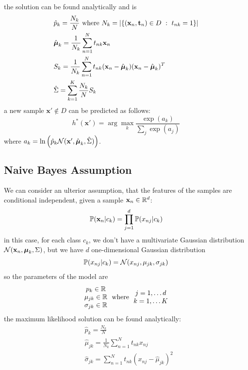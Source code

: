 \documentclass[10pt, letterpaper]{report}
\begin{document}
the solution can be found analytically and is\begin{align}
	 & \hat p_k=\frac{N_k}{N}\text{ where }N_k=|\{(\mathbf x_n,\mathbf t_n)\in D \ : \ t_{nk}=1\}| \\
	 & \hat{{\boldsymbol{\mu}}}_k=\frac{1}{N_k}\sum_{n=1}^Nt_{nk}\mathbf x_n                                       \\
	 & S_k=\frac{1}{N_k}\sum_{n=1}^Nt_{nk}(\mathbf x_n-\hat{{\boldsymbol{\mu}}}_k)(\mathbf x_n-\hat{{\boldsymbol{\mu}}}_k)^T       \\
	 & \hat \Sigma = \sum_{k=1}^{K}\frac{N_k}{N}S_k
\end{align}
a new sample $\mathbf x'\notin D$ can be predicted as follows:\begin{equation}
	h^*(\mathbf x')=\arg\max_k\frac{\exp(a_k)}{\sum_j\exp(a_j)}
\end{equation}
where $a_k=\ln\left(\hat p_k\mathcal N(\mathbf x',\hat{{\boldsymbol{\mu}}}_k,\hat\Sigma)\right)$.
\subsection{Naive Bayes Assumption}
We can consider an ulterior assumption, that the features of the samples are conditional independent, given a sample $\mathbf x_n\in {\mathbb R}^d$:\begin{equation}
	{\mathbb P}(\mathbf x_n|c_k)=\prod_{j=1}^d{\mathbb P}(x_{nj}|c_k)
\end{equation}
in this case, for each class $c_k$, we don't have a multivariate Gaussian distribution $\mathcal N(\mathbf x_n,{\boldsymbol{\mu}}_k,\Sigma)$, but we have $d$ one-dimensional Gaussian distribution\begin{equation}
	{\mathbb P}(x_{nj}|c_k)=\mathcal N(x_{nj},\mu_{jk},\sigma_{jk})
\end{equation}so the parameters of the model are
\begin{equation}
	\begin{matrix}
		p_k\in{\mathbb R}       \\
		\mu_{jk}\in {\mathbb R} \\
		\sigma_{jk}\in {\mathbb R}
	\end{matrix} \ \text{ where } \
	\begin{matrix}
		j=1,\dots d \\ k=1,\dots K
	\end{matrix}
\end{equation}
the maximum likelihood solution can be found analytically:\begin{align}
	 & \hat p_k=\frac{N_k}{N}                                    \\
	 & \hat\mu_{jk}=\frac{1}{N_k}\sum_{n=1}^Nt_{nk}x_{nj}        \\
	 & \hat\sigma_{jk}=\sum_{n=1}^Nt_{nk}(x_{nj}-\hat\mu_{jk})^2
\end{align}
\end{document}
